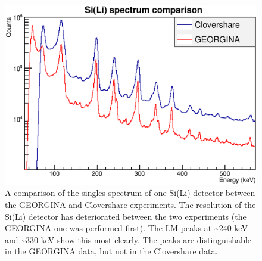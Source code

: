 \begin{figure}[!]
    \centering
    \includegraphics[scale=0.6]{Future_Figs/ResolutionComparison.eps}
    \caption{A comparison of the singles spectrum of one Si(Li) detector between the GEORGINA and Clovershare experiments. The resolution of the Si(Li) detector has deteriorated between the two experiments (the GEORGINA one was performed first). The LM peaks at \~{}240 keV and \~{}330 keV show this most clearly. The peaks are distinguishable in the GEORGINA data, but not in the Clovershare data.}
    \label{fig:bad_sili}
\end{figure}